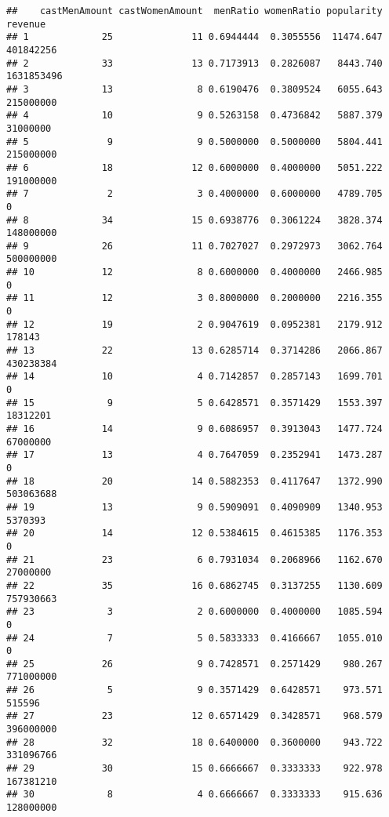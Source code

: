 \documentclass[
]{article}
\begin{document}
\begin{verbatim}
##    castMenAmount castWomenAmount  menRatio womenRatio popularity    revenue
## 1             25              11 0.6944444  0.3055556  11474.647  401842256
## 2             33              13 0.7173913  0.2826087   8443.740 1631853496
## 3             13               8 0.6190476  0.3809524   6055.643  215000000
## 4             10               9 0.5263158  0.4736842   5887.379   31000000
## 5              9               9 0.5000000  0.5000000   5804.441  215000000
## 6             18              12 0.6000000  0.4000000   5051.222  191000000
## 7              2               3 0.4000000  0.6000000   4789.705          0
## 8             34              15 0.6938776  0.3061224   3828.374  148000000
## 9             26              11 0.7027027  0.2972973   3062.764  500000000
## 10            12               8 0.6000000  0.4000000   2466.985          0
## 11            12               3 0.8000000  0.2000000   2216.355          0
## 12            19               2 0.9047619  0.0952381   2179.912     178143
## 13            22              13 0.6285714  0.3714286   2066.867  430238384
## 14            10               4 0.7142857  0.2857143   1699.701          0
## 15             9               5 0.6428571  0.3571429   1553.397   18312201
## 16            14               9 0.6086957  0.3913043   1477.724   67000000
## 17            13               4 0.7647059  0.2352941   1473.287          0
## 18            20              14 0.5882353  0.4117647   1372.990  503063688
## 19            13               9 0.5909091  0.4090909   1340.953    5370393
## 20            14              12 0.5384615  0.4615385   1176.353          0
## 21            23               6 0.7931034  0.2068966   1162.670   27000000
## 22            35              16 0.6862745  0.3137255   1130.609  757930663
## 23             3               2 0.6000000  0.4000000   1085.594          0
## 24             7               5 0.5833333  0.4166667   1055.010          0
## 25            26               9 0.7428571  0.2571429    980.267  771000000
## 26             5               9 0.3571429  0.6428571    973.571     515596
## 27            23              12 0.6571429  0.3428571    968.579  396000000
## 28            32              18 0.6400000  0.3600000    943.722  331096766
## 29            30              15 0.6666667  0.3333333    922.978  167381210
## 30             8               4 0.6666667  0.3333333    915.636  128000000
\end{verbatim}
\end{document}
